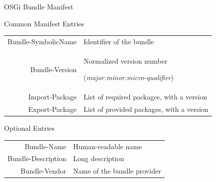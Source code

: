 \begin{frame}{OSGi Bundle Manifest}
\begin{block}{Common Manifest Entries}
\begin{center}
\begin{tabular}{rp{}}
Bundle-SymbolicName & Identifier of the bundle\\
Bundle-Version & Normalized version number \par (\textit{major.minor.micro-qualifier})\\
Import-Package & List of required packages, \newline with a version\\
Export-Package & List of provided packages, \newline with a version\\
\end{tabular}
\end{center}
\end{block}

\begin{block}{Optional Entries}
\begin{center}
\begin{tabular}{rp{}}
Bundle-Name & Human-readable name\\
Bundle-Description & Long description\\
Bundle-Vendor & Name of the bundle provider\\
\end{tabular}
\end{center}
\end{block}
\end{frame}

